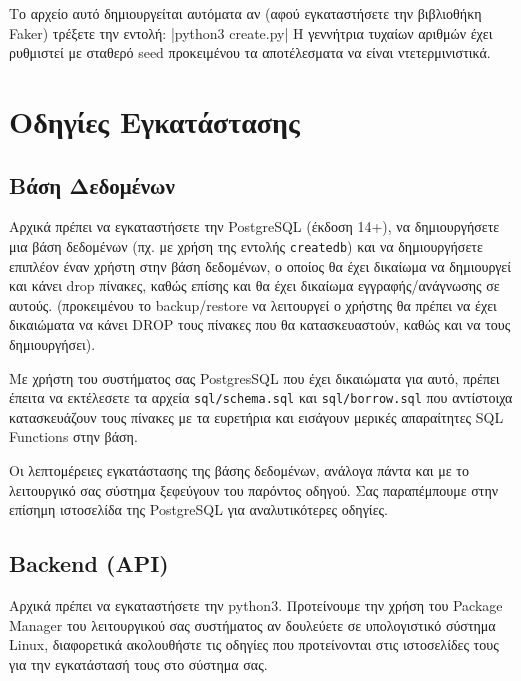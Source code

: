 \documentclass[a4paper]{article}
\begin{document}
\par Το αρχείο αυτό δημιουργείται αυτόματα αν (αφού εγκαταστήσετε την βιβλιοθήκη Faker) τρέξετε την εντολή:
|python3 create.py|
Η γεννήτρια τυχαίων αριθμών έχει ρυθμιστεί με σταθερό seed προκειμένου τα αποτέλεσματα να είναι ντετερμινιστικά.

\section{Οδηγίες Εγκατάστασης}

\subsection{Βάση Δεδομένων}
\label{install_db}
\par Αρχικά πρέπει να εγκαταστήσετε την PostgreSQL (έκδοση 14+), να δημιουργήσετε μια βάση δεδομένων (πχ. με χρήση της εντολής \texttt{createdb}) και να δημιουργήσετε επιπλέον έναν χρήστη στην βάση δεδομένων, ο οποίος θα έχει δικαίωμα να δημιουργεί και κάνει drop πίνακες, καθώς επίσης και θα έχει δικαίωμα εγγραφής/ανάγνωσης σε αυτούς. (προκειμένου το backup/restore να λειτουργεί ο χρήστης θα πρέπει να έχει δικαιώματα να κάνει DROP τους πίνακες που θα κατασκευαστούν, καθώς και να τους δημιουργήσει).
\par Με χρήστη του συστήματος σας PostgresSQL που έχει δικαιώματα για αυτό, πρέπει έπειτα να εκτέλεσετε τα αρχεία \texttt{sql/schema.sql} και \texttt{sql/borrow.sql} που αντίστοιχα κατασκευάζουν τους πίνακες με τα ευρετήρια και εισάγουν μερικές απαραίτητες SQL Functions στην βάση.

\par Οι λεπτομέρειες εγκατάστασης της βάσης δεδομένων, ανάλογα πάντα και με το λειτουργικό σας σύστημα ξεφεύγουν του παρόντος οδηγού. Σας παραπέμπουμε στην επίσημη ιστοσελίδα της PostgreSQL για αναλυτικότερες οδηγίες.

\subsection{Backend (API)}

\par Αρχικά πρέπει να εγκαταστήσετε την python3. Προτείνουμε την χρήση του Package Manager του λειτουργικού σας συστήματος αν δουλεύετε σε υπολογιστικό σύστημα Linux, διαφορετικά ακολουθήστε τις οδηγίες που προτείνονται στις ιστοσελίδες τους για την εγκατάστασή τους στο σύστημα σας.
\end{document}
